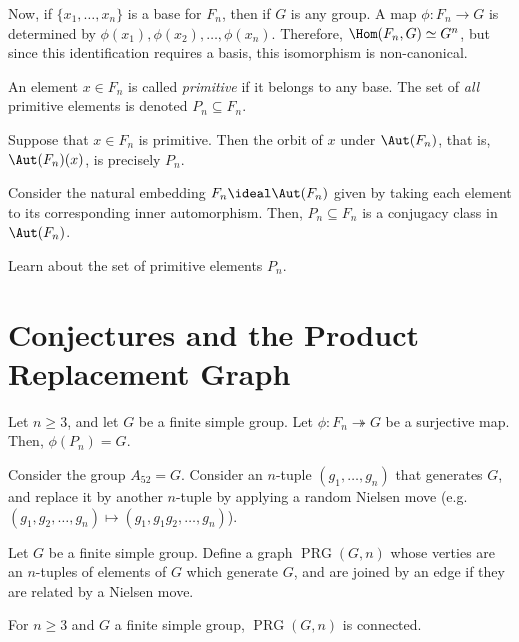 \documentclass[12pt]{article}
\begin{document}
Now, if $\{x_1,\ldots,x_n\}$ is a base for $F_n$, then if $G$ is any group. A map $\phi: F_n \rightarrow G$ is determined by $\phi(x_1),\phi(x_2),\ldots,\phi(x_n)$. Therefore, $\Hom(F_n,G) \simeq G^n$, but since this identification requires a basis, this isomorphism is non-canonical.

\begin{definition}\label{def:Primitive_Elements}
    An element $x \in F_n$ is called \emph{primitive} if it belongs to any base. The set of \emph{all} primitive elements is denoted $P_n \subseteq F_n$.
\end{definition}

\begin{example}\label{exam:Primitive_Elements_and_Automorphisms}
    Suppose that $x \in F_n$ is primitive. Then the orbit of $x$ under $\Aut(F_n)$, that is, $\Aut(F_n)(x)$, is precisely $P_n$.
\end{example}

\begin{example}\label{exam:Self_Embeddings}
    Consider the natural embedding $F_n \ideal \Aut(F_n)$ given by taking each element to its corresponding inner automorphism. Then, $P_n \subseteq F_n$ is a conjugacy class in $\Aut(F_n)$.
\end{example}

\begin{problem}\label{prob:Learn_About_Primitive_Elements}
    Learn about the set of primitive elements $P_n$.
\end{problem}

\section{Conjectures and the Product Replacement Graph}

\begin{conjecture}\label{conj:An_Open_Problem}
    Let $n \geq 3$, and let $G$ be a finite simple group. Let $\phi: F_n \twoheadrightarrow G$ be a surjective map. Then, $\phi(P_n) = G$.
\end{conjecture}

Consider the group $A_{52} = G$. Consider an $n$-tuple $(g_1,\ldots,g_n)$ that generates $G$, and replace it by another $n$-tuple by applying a random Nielsen move (e.g. $(g_1,g_2,\ldots,g_n) \mapsto (g_1,g_1g_2,\ldots,g_n)$).

\begin{definition}\label{def:The_Graph_PRG}
    Let $G$ be a finite simple group. Define a graph $\operatorname{PRG}(G,n)$ whose verties are an $n$-tuples of elements of $G$ which generate $G$, and are joined by an edge if they are related by a Nielsen move.
\end{definition}

\begin{conjecture}\label{conj:Weigold_Conjecture}
    For $n \geq 3$ and $G$ a finite simple group, $\operatorname{PRG}(G,n)$ is connected.
\end{conjecture}
\end{document}

